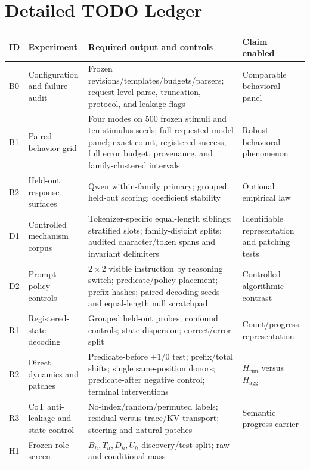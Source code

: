 \documentclass[10pt,twocolumn]{article}
\begin{document}
\clearpage
\onecolumn
\section{Detailed TODO Ledger}
\begin{center}
\small
\captionsetup{hypcap=false}
\begin{tabularx}{\textwidth}{
  >{\raggedright\arraybackslash}p{}
  >{\raggedright\arraybackslash}p{}
  Y
  >{\raggedright\arraybackslash}p{0.21\textwidth}}
\toprule
ID & Experiment & Required output and controls & Claim enabled \\
\midrule
B0 & Configuration and failure audit &
Frozen revisions/templates/budgets/parsers; request-level parse, truncation, protocol, and leakage
flags & Comparable behavioral panel \\
B1 & Paired behavior grid &
Four modes on 500 frozen stimuli and ten stimulus seeds; full requested model panel; exact count,
registered success, full error budget, provenance, and family-clustered intervals &
Robust behavioral phenomenon \\
B2 & Held-out response surfaces &
Qwen within-family primary; grouped held-out scoring; coefficient stability &
Optional empirical law \\
D1 & Controlled mechanism corpus &
Tokenizer-specific equal-length siblings; stratified slots; family-disjoint splits; audited
character/token spans and invariant delimiters &
Identifiable representation and patching tests \\
D2 & Prompt-policy controls &
$2\times2$ visible instruction by reasoning switch; predicate/policy placement; prefix hashes;
paired decoding seeds and equal-length null scratchpad &
Controlled algorithmic contrast \\
R1 & Registered-state decoding &
Grouped held-out probes; confound controls; state dispersion; correct/error split &
Count/progress representation \\
R2 & Direct dynamics and patches &
Predicate-before $+1/0$ test; prefix/total shifts; single same-position donors; predicate-after
negative control; terminal interventions &
$H_{\mathrm{run}}$ versus $H_{\mathrm{agg}}$ \\
R3 & CoT anti-leakage and state control &
No-index/random/permuted labels; residual versus trace/KV transport; steering and natural patches &
Semantic progress carrier \\
H1 & Frozen role screen &
$B_h,T_h,D_h,U_h$ discovery/test split; raw and conditional mass &

\end{tabularx}
\end{center}
\end{document}

